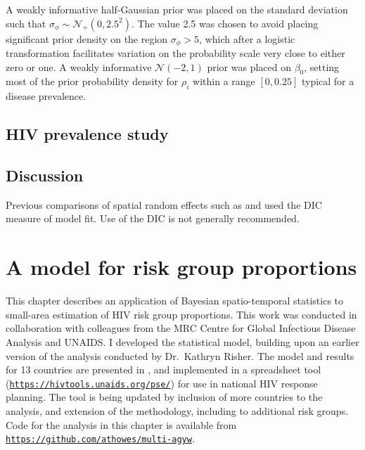\documentclass[a4paper, nobind]{templates/ociamthesis}
\begin{document}
A weakly informative half-Gaussian prior was placed on the standard deviation \autocite{gelman2006prior} such that \(\sigma_\phi \sim \mathcal{N}_+(0, 2.5^2)\).
The value 2.5 was chosen to avoid placing significant prior density on the region \(\sigma_\phi > 5\), which after a logistic transformation facilitates variation on the probability scale very close to either zero or one.
A weakly informative \(\mathcal{N}(-2, 1)\) prior was placed on \(\beta_0\), setting most of the prior probability density for \(\rho_i\) within a range \([0, 0.25]\) typical for a disease prevalence.

\hypertarget{hiv-prevalence-study}{%
\section{HIV prevalence study}\label{hiv-prevalence-study}}

\hypertarget{discussion}{%
\section{Discussion}\label{discussion}}

Previous comparisons of spatial random effects such as \textcite{best2005comparison} and \textcite{lee2011comparison} used the DIC measure of model fit.
Use of the DIC is not generally recommended.

\hypertarget{multi-agyw}{%
\chapter{A model for risk group proportions}\label{multi-agyw}}

\adjustmtc
{}

This chapter describes an application of Bayesian spatio-temporal statistics to small-area estimation of HIV risk group proportions.
This work was conducted in collaboration with colleagues from the MRC Centre for Global Infectious Disease Analysis and UNAIDS.
I developed the statistical model, building upon an earlier version of the analysis conducted by Dr.~Kathryn Risher.
The model and results for 13 countries are presented in \textcite{howes2023spatio}, and implemented in a spreadsheet tool (\href{https://hivtools.unaids.org/pse/}{\texttt{https://hivtools.unaids.org/pse/}}) for use in national HIV response planning.
The tool is being updated by inclusion of more countries to the analysis, and extension of the methodology, including to additional risk groups.
Code for the analysis in this chapter is available from \href{https://github.com/athowes/multi-agyw}{\texttt{https://github.com/athowes/multi-agyw}}.
\end{document}
